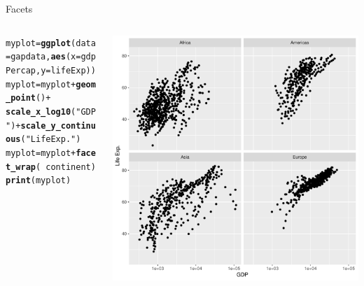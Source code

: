 \documentclass[aspectratio=169]{beamer}\usepackage[]{graphicx}\usepackage[]{color}
\makeatletter
\def\maxwidth{ %
  \ifdim\Gin@nat@width>\linewidth
    \linewidth
  \else
    \Gin@nat@width
  \fi
}
\newcommand{\hlstr}[1]{\textcolor[rgb]{0.192,0.494,0.8}{#1}}%
\newcommand{\hlopt}[1]{\textcolor[rgb]{0,0,0}{#1}}%
\newcommand{\hlstd}[1]{\textcolor[rgb]{0.345,0.345,0.345}{#1}}%
\newcommand{\hlkwb}[1]{\textcolor[rgb]{0.69,0.353,0.396}{#1}}%
\newcommand{\hlkwc}[1]{\textcolor[rgb]{0.333,0.667,0.333}{#1}}%
\newcommand{\hlkwd}[1]{\textcolor[rgb]{0.737,0.353,0.396}{\textbf{#1}}}%
\newenvironment{kframe}{%
 \def\at@end@of@kframe{}%
 \ifinner\ifhmode%
  \def\at@end@of@kframe{\end{minipage}}%
  \begin{minipage}{\columnwidth}%
 \fi\fi%
 \def\FrameCommand##1{\hskip\@totalleftmargin \hskip-\fboxsep
 \colorbox{shadecolor}{##1}\hskip-\fboxsep
     \hskip-\linewidth \hskip-\@totalleftmargin \hskip\columnwidth}%
 \MakeFramed {\advance\hsize-\width
   \@totalleftmargin\z@ \linewidth\hsize
   \@setminipage}}%
 {\par\unskip\endMakeFramed%
 \at@end@of@kframe}
\newenvironment{knitrout}{}{} %
\makeatother
\begin{document}
\begin{frame}[fragile]{Facets}
\begin{columns}
  \begin{column}{0.50\textwidth}
\begin{knitrout}\tiny
{}\color{fgcolor}\begin{kframe}
\begin{alltt}
\hlstd{myplot} \hlkwb{=} \hlkwd{ggplot}\hlstd{(}\hlkwc{data}\hlstd{=gapdata,} \hlkwd{aes}\hlstd{(}\hlkwc{x}\hlstd{=gdpPercap,} \hlkwc{y}\hlstd{=lifeExp))}
\hlstd{myplot} \hlkwb{=} \hlstd{myplot} \hlopt{+} \hlkwd{geom_point}\hlstd{()} \hlopt{+}
  \hlkwd{scale_x_log10}\hlstd{(}\hlstr{"GDP"}\hlstd{)} \hlopt{+} \hlkwd{scale_y_continuous}\hlstd{(}\hlstr{"Life Exp."}\hlstd{)}
\hlstd{myplot} \hlkwb{=} \hlstd{myplot} \hlopt{+} \hlkwd{facet_wrap}\hlstd{(}\hlopt{~}\hlstd{continent)}
\hlkwd{print}\hlstd{(myplot)}
\end{alltt}
\end{kframe}
\end{knitrout}
  \end{column}
  \begin{column}{0.5\textwidth}
\begin{knitrout}\scriptsize
{}\color{fgcolor}
\includegraphics[width=\maxwidth]{figure/unnamed-chunk-27-1} 

\end{knitrout}
  \end{column}
\end{columns}
\end{frame}
\end{document}
